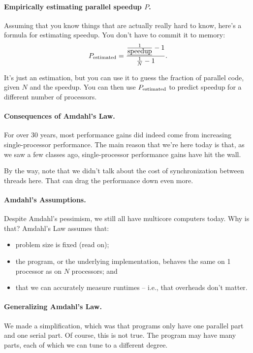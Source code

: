    \paragraph{Empirically estimating parallel speedup $P$.}
Assuming that you know things that are actually really hard to know, here's a formula for estimating speedup. You don't have to commit it to memory:
  \[P_{\mbox{\scriptsize estimated}} = \frac{\frac{1}{\mbox{\em speedup}}-1}{\frac{1}{N}-1}.\]

It's just an estimation, but you can use it to guess the fraction of parallel code, given $N$ and the speedup. You can then use $P_{\mbox{\scriptsize estimated}}$ to predict speedup for a different number of processors.

\paragraph{Consequences of Amdahl's Law.}
For over 30 years, most performance gains did indeed come from
increasing single-processor performance. The main reason that we're
here today is that, as we saw a few classes ago,
single-processor performance gains have hit the wall.

By the way, note that we didn't talk about the cost of synchronization
between threads here. That can drag the performance down even more.

\paragraph{Amdahl's Assumptions.}
Despite Amdahl's pessimism, we still all have multicore computers today.
Why is that? Amdahl's Law assumes that:
\begin{itemize}[noitemsep]
    \item problem size is fixed (read on);
    \item the program, or the underlying implementation, behaves the same on 1 processor as on $N$ processors; and
    \item that we can accurately measure runtimes -- i.e., that overheads don't matter.
\end{itemize}

\paragraph{Generalizing Amdahl's Law.} We made a simplification,
which was that programs only have one parallel part and one serial part.
Of course, this is not true. The program may have many parts,
 each of which we can tune to a different degree.

